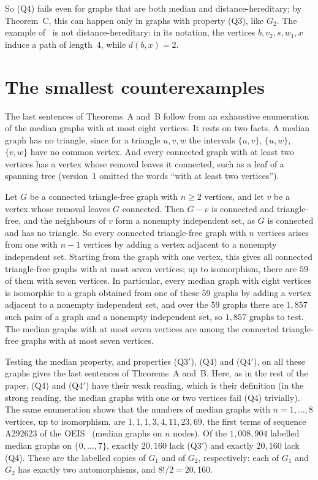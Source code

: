 \documentclass[11pt]{article}
\theoremstyle{remark}
\newcommand{\QA}{\textup{(Q3)}}
\newcommand{\QAp}{\textup{(Q3$'$)}}
\newcommand{\QB}{\textup{(Q4)}}
\newcommand{\QBp}{\textup{(Q4$'$)}}
\begin{document}
So \QB{} fails even for graphs that are both median and distance-hereditary;
by Theorem~C, this can happen only in graphs with property \QA, like $G_2$. The
example of~\cite{mo-a} is not distance-hereditary: in its notation, the
vertices $b,v_2,s,w_1,x$ induce a path of length~$4$, while $d(b,x)=2$.

\section{The smallest counterexamples}\label{sec:min}
The last sentences of Theorems~A and~B follow from an exhaustive enumeration
of the median graphs with at most eight vertices. It rests on two facts. A
median graph has no triangle, since for a triangle $u,v,w$ the intervals
$\{u,v\}$, $\{u,w\}$, $\{v,w\}$ have no common vertex. And every connected
graph with at least two vertices has a vertex whose removal leaves it
connected, such as a leaf of a spanning tree (version~1 omitted the words
``with at least two vertices'').

Let $G$ be a connected triangle-free graph with $n\ge2$ vertices, and let $v$ be
a vertex whose removal leaves $G$ connected. Then $G-v$ is connected and
triangle-free, and the neighbours of $v$ form a nonempty independent set, as
$G$ is connected and has no triangle. So every connected triangle-free graph
with $n$ vertices arises from one with $n-1$ vertices by adding a vertex
adjacent to a nonempty independent set. Starting from the graph with one
vertex, this gives all connected triangle-free graphs with at most seven
vertices; up to isomorphism, there are $59$ of them with seven vertices. In
particular, every median graph with eight vertices is isomorphic to a graph
obtained from one of these $59$ graphs by adding a vertex adjacent to a
nonempty independent set, and
over the $59$ graphs there are $1{,}857$ such pairs of a graph and a nonempty
independent set, so $1{,}857$ graphs to test. The median graphs with at most
seven vertices are among the connected triangle-free graphs with at most
seven vertices.

Testing the median property, and properties \QAp, \QB{} and \QBp, on all
these graphs gives the last sentences of Theorems~A and~B. Here, as in the
rest of the paper, \QB{} and \QBp{} have their weak reading, which is their
definition (in the strong reading, the median graphs with one or two vertices
fail \QB{} trivially). The same enumeration shows that the numbers of median graphs with
$n=1,\dots,8$ vertices, up to isomorphism, are $1,1,1,3,4,11,23,69$, the first
terms of sequence A292623 of the OEIS~\cite{oeis} (median graphs on $n$
nodes). Of the $1{,}008{,}904$ labelled median graphs on $\{0,\dots,7\}$,
exactly $20{,}160$ lack \QAp{} and exactly $20{,}160$ lack \QB. These are the
labelled copies of $G_1$ and of $G_2$, respectively: each of $G_1$ and $G_2$
has exactly two automorphisms, and $8!/2=20{,}160$.
\end{document}
